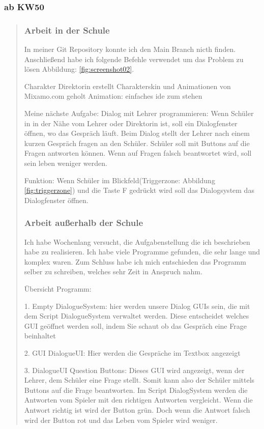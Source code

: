 
\subsubsection{ab KW50}
\begin{quote}
	\subsubsection*{Arbeit in der Schule}
	In meiner Git Repository konnte ich den Main Branch nicth finden. Anschließend habe ich folgende Befehle verwendet um das Problem zu lösen Abbildung: \ref{fig:screenshot02}.
	
	
	Charakter Direktorin erstellt
	Charakterskin und Animationen von Mixamo.com geholt
	Animation: einfaches ide zum stehen
	
	
	Meine nächste Aufgabe:
	Dialog mit Lehrer programmieren: Wenn Schüler in in der Nähe vom Lehrer oder Direktorin ist, soll ein Dialogfenster öffnen, wo das Gespräch läuft.
	Beim Dialog stellt der Lehrer nach einem kurzen Gespräch fragen an den Schüler.
	Schüler soll mit Buttons auf die Fragen antworten können.
	Wenn auf Fragen falsch beantwortet wird, soll sein leben weniger werden.
	
	Funktion:
	Wenn Schüler im Blickfeld(Triggerzone: Abbildung \ref{fig:triggerzone}) und die Taste F gedrückt wird soll das Dialogsystem das Dialogfenster öffnen.
	
	\subsubsection*{Arbeit außerhalb der Schule}
	
	Ich habe Wochenlang versucht, die Aufgabenstellung die ich beschrieben habe zu realisieren. Ich habe viele Programme gefunden, die sehr lange und komplex waren. Zum Schluss habe ich mich entschieden das Programm selber zu schreiben, welches sehr Zeit in Anspruch nahm.

	
	Übersicht Programm:
	
	1. Empty DialogueSystem: hier werden unsere Dialog GUIs sein, die mit dem Script DialogueSystem verwaltet werden. Diese entscheidet welches GUI geöffnet werden soll, indem Sie schaut ob das Gespräch eine Frage beinhaltet
	
	2. GUI DialogueUI: Hier werden die Gespräche im Textbox angezeigt
	
	3. DialogueUI Question Buttons: Dieses GUI wird angezeigt, wenn der Lehrer, dem Schüler eine Frage stellt. Somit kann also der Schüler mittels Buttons auf die Frage beantworten. Im Script DialogSystem werden die Antworten vom Spieler mit den richtigen Antworten vergleicht. Wenn die Antwort richtig ist wird der Button grün. Doch wenn die Antwort falsch wird der Button rot und das Leben vom Spieler wird weniger.
	

\end{quote}
